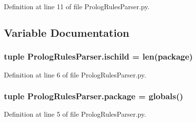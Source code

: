 Definition at line 11 of file Prolog\+Rules\+Parser.\+py.



\subsection{Variable Documentation}
\hypertarget{namespace_prolog_rules_parser_aac8b33350217b52d41d2f03712a9a972}{}
\subsubsection[{ischild}]{\setlength{\rightskip}{0pt plus 5cm}tuple Prolog\+Rules\+Parser.\+ischild = len({\bf package})}\label{namespace_prolog_rules_parser_aac8b33350217b52d41d2f03712a9a972}


Definition at line 6 of file Prolog\+Rules\+Parser.\+py.

\hypertarget{namespace_prolog_rules_parser_af188b237d1e6379d338e445d97efe14f}{}
\subsubsection[{package}]{\setlength{\rightskip}{0pt plus 5cm}tuple Prolog\+Rules\+Parser.\+package = globals()}\label{namespace_prolog_rules_parser_af188b237d1e6379d338e445d97efe14f}


Definition at line 5 of file Prolog\+Rules\+Parser.\+py.

